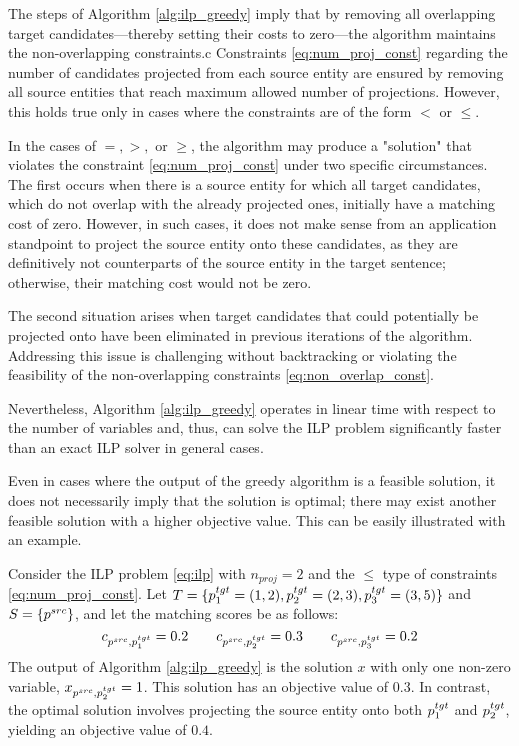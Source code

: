 The steps of Algorithm \ref{alg:ilp_greedy} imply that by removing all overlapping
target candidates—thereby setting their costs to zero—the algorithm maintains the non-overlapping constraints.c
Constraints \eqref{eq:num_proj_const} regarding the number of candidates projected from
each source entity are ensured by removing all source entities that reach maximum allowed number
of projections.  However, this holds true only in cases where the constraints are of
the form \( < \) or \( \leq \).

In the cases of \( =, >, \) or \( \geq \), the algorithm may produce a "solution" that
violates the constraint \eqref{eq:num_proj_const} under two specific circumstances.
The first occurs when there is a source entity for which all target candidates,
which do not overlap with the already projected ones, initially have a matching
cost of zero. However, in such cases, it does not make sense from an application standpoint
to project the source entity onto these candidates, as they are definitively not
counterparts of the source entity in the target sentence; otherwise, their
matching cost would not be zero.

The second situation arises when target candidates that could potentially be
projected onto have been eliminated in previous iterations of the algorithm.
Addressing this issue is challenging without backtracking or violating the
feasibility of the non-overlapping constraints \eqref{eq:non_overlap_const}.

Nevertheless, Algorithm \ref{alg:ilp_greedy} operates in linear time with respect to
the number of variables and, thus, can solve the ILP problem significantly faster than
an exact ILP solver in general cases.

Even in cases where the output of the greedy algorithm is a feasible solution, it does not necessarily imply that the solution is optimal; there may exist another feasible solution with a higher objective value. This can be easily illustrated with an example.

Consider the ILP problem \eqref{eq:ilp} with \( n_{proj} = 2 \) and the \( \leq \)
type of constraints \eqref{eq:num_proj_const}. Let \( T = \{ p_1^{tgt} = (1, 2), p_2^{tgt} = (2, 3), p_3^{tgt} = (3, 5) \} \)
and \( S = \{ p^{src} \} \), and let the matching scores be as follows:
\[
  c_{p^{src}, p_1^{tgt}} = 0.2 \qquad
  c_{p^{src}, p_2^{tgt}} = 0.3 \qquad
  c_{p^{src}, p_3^{tgt}} = 0.2
\]
The output of Algorithm \ref{alg:ilp_greedy} is the solution \( x \) with only one
non-zero variable, \( x_{p^{src}, p_2^{tgt}} = 1 \). This solution has an objective
value of \( 0.3 \). In contrast, the optimal solution involves projecting the source
entity onto both \( p_1^{tgt} \) and \( p_2^{tgt} \), yielding an objective value
of \( 0.4 \).
